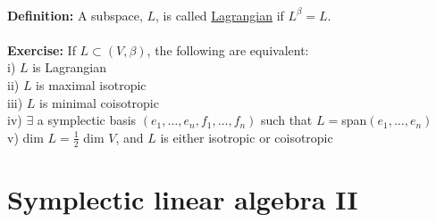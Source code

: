 \documentclass[12pt]{report}
\theoremstyle{definition}
\theoremstyle{remark}
\numberwithin{equation}{section}
\theoremstyle{definition}
\begin{document}
\\
\textbf{Definition: }A subspace, $L$, is called \underline{Lagrangian} if $L^\beta = L$. \\\\
\textbf{Exercise: }If $L\subset (V,\beta)$, the following are equivalent: \\
i) $L$ is Lagrangian \\
ii) $L$ is maximal isotropic\\
iii) $L$ is minimal coisotropic\\
iv) $\exists$ a symplectic basis $(e_1,\dots,e_n,f_1,\dots,f_n)$ such that $L = $span$(e_1,\dots,e_n)$\\
v) dim $L = \frac{1}{2}$ dim $V$, and $L$ is either isotropic or coisotropic 
\chapter{Symplectic linear algebra II}
\end{document}

